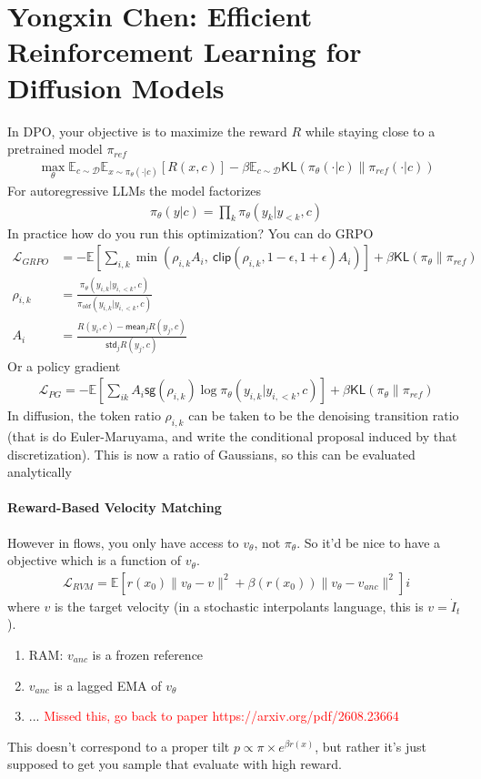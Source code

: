 \documentclass[11pt,fleqn]{article}
\numberwithin{equation}{section}
\theoremstyle{definition}
\theoremstyle{definition}
\begin{document}
\section{Yongxin Chen: Efficient Reinforcement Learning for Diffusion Models}
In DPO, your objective is to maximize the reward $R$ while staying close to a pretrained model $\pi_{ref}$
\begin{align}
	\max_\theta \mathbb E_{c \sim \mathcal D} \mathbb E_{x \sim \pi_{\theta}(\cdot | c)} [R(x,c)] - \beta \mathbb E_{c \sim \mathcal D} \textsf{KL}(\pi_\theta(\cdot | c) \| \pi_{ref}(\cdot | c))
\end{align}
For autoregressive LLMs the model factorizes
\begin{align}
	\pi_\theta(y | c) = \prod_k \pi_\theta(y_k | y_{<k} , c)
\end{align} 
In practice how do you run this optimization? You can do GRPO
\begin{align}
	\mathcal L_{GRPO} & = - \mathbb E \left[ \sum_{i,k} \min \left( \rho_{i,k} A_i, \ \textsf{clip} (\rho_{i,k}, 1-\epsilon, 1+ \epsilon)  A_i  \right)\right] +  \beta \textsf{KL}(\pi_\theta \| \pi_{ref})\\
	\rho_{i,k} & = \frac{\pi_\theta(y_{i,k} | y_{i, < k}, c)}{\pi_{old}(y_{i,k} | y_{i, < k}, c)}\\
	A_i & = \frac{R(y_i, c) - \textsf{mean}_j R(y_j, c)}{\textsf{std}_j R(y_j, c)}
\end{align}
Or a policy gradient
\begin{align}
	\mathcal L_{PG} = - \mathbb E \left[  \sum_{ik} A_i \textsf{sg}(\rho_{i,k}) \log \pi_{\theta}(y_{i,k} | y_{i, < k} , c) \right] + \beta \textsf{KL}(\pi_\theta \| \pi_{ref})
\end{align}
In diffusion, the token ratio $\rho_{i,k}$ can be taken to be the denoising transition ratio (that is do Euler-Maruyama, and write the conditional proposal induced by that discretization). This is now a ratio of Gaussians, so this can be evaluated analytically


\paragraph{Reward-Based Velocity Matching} However in flows, you only have access to $v_\theta$, not $\pi_\theta$. So it'd be nice to have a objective which is a function of $v_\theta$.
\begin{align}
	\mathcal L_{RVM} = \mathbb E[r(x_0) \|v_\theta - v\|^2 + \beta(r(x_0)) \| v_\theta - v_{anc}\|^2]i
\end{align}
where $v$ is the target velocity (in a stochastic interpolants language, this is $v = \dot I_t$).
\begin{enumerate}
	\item RAM: $v_{anc}$ is a frozen reference
	\item $v_{anc}$ is a lagged EMA of $v_\theta$
	\item ... \textcolor{red}{Missed this, go back to paper https://arxiv.org/pdf/2608.23664}
\end{enumerate}
This doesn't correspond to a proper tilt $p \propto \pi \times e^{\beta r(x)}$, but rather it's just supposed to get you sample that evaluate with high reward.
 
\end{document}
